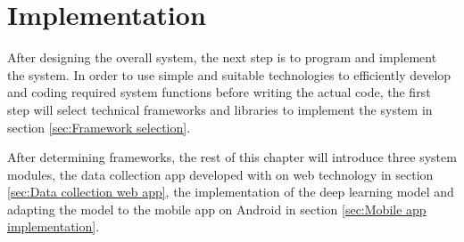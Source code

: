 \chapter{Implementation}
\label{chap:Implementation}
After designing the overall system, the next step is to program and implement the system.
In order to use simple and suitable technologies to efficiently develop and coding required system functions before writing the actual code, the first step will select technical frameworks and libraries to implement the system in section \ref{sec:Framework selection}.

After determining frameworks, the rest of this chapter will introduce three system modules, the data collection app developed with on web technology in section \ref{sec:Data collection web app}, the implementation of the deep learning model and adapting the model to the mobile app on Android in section \ref{sec:Mobile app implementation}.



